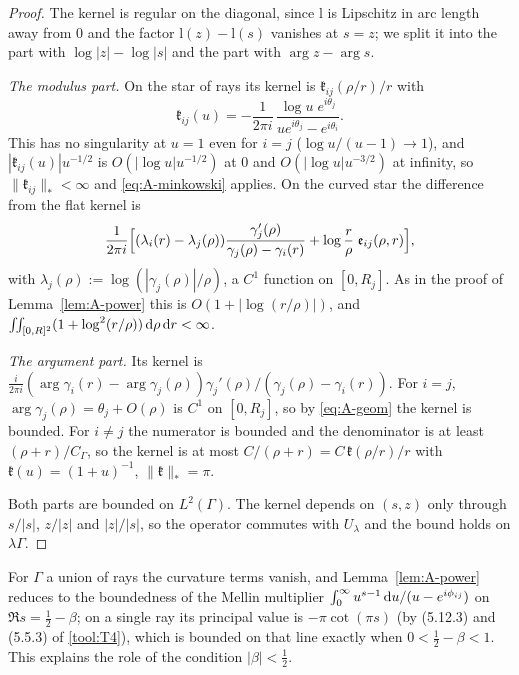 \begin{proof}
The kernel is regular on the diagonal, since $\mathrm l$ is Lipschitz in arc length away from $0$ and the factor
$\mathrm l(z)-\mathrm l(s)$ vanishes at $s=z$; we split it into the part with $\log|z|-\log|s|$ and the part with
$\arg z-\arg s$.

\emph{The modulus part.} On the star of rays its kernel is $\mathfrak k_{ij}(\rho/r)/r$ with
\[
  \mathfrak k_{ij}(u)=-\frac1{2\pi i}\,\frac{\log u\;e^{i\theta_j}}{ue^{i\theta_j}-e^{i\theta_i}} .
\]
This has no singularity at
$u=1$ even for $i=j$ ($\log u/(u-1)\to1$), and $|\mathfrak k_{ij}(u)|u^{-1/2}$ is $O(|\log u|u^{-1/2})$ at $0$ and
$O(|\log u|u^{-3/2})$ at infinity, so $\|\mathfrak k_{ij}\|_*<\infty$ and \eqref{eq:A-minkowski} applies. On the curved star
the difference from the flat kernel is
\[
  \frac1{2\pi i}\Bigl[(\lambda_i(r)-\lambda_j(\rho))\frac{\gamma_j'(\rho)}{\gamma_j(\rho)-\gamma_i(r)}
  +\log\frac r\rho\;\mathfrak e_{ij}(\rho,r)\Bigr],
\]
with $\lambda_j(\rho):=\log(|\gamma_j(\rho)|/\rho)$, a $C^1$ function on
$[0,R_j]$. As in the proof of Lemma~\ref{lem:A-power} this is $O(1+|\log(r/\rho)|)$, and
$\iint_{[0,R]^2}(1+\log^2(r/\rho))\,\mathrm{d}\rho\,\mathrm{d} r<\infty$.

\emph{The argument part.} Its kernel is $\frac{i}{2\pi i}(\arg\gamma_i(r)-\arg\gamma_j(\rho))\gamma_j'(\rho)/(\gamma_j(\rho)-
\gamma_i(r))$. For $i=j$, $\arg\gamma_j(\rho)=\theta_j+O(\rho)$ is $C^1$ on $[0,R_j]$, so by \eqref{eq:A-geom} the kernel is
bounded. For $i\ne j$ the numerator is bounded and the denominator is at least $(\rho+r)/C_\Gamma$, so the kernel is at most
$C/(\rho+r)=C\,\mathfrak k(\rho/r)/r$ with $\mathfrak k(u)=(1+u)^{-1}$, $\|\mathfrak k\|_*=\pi$.

Both parts are bounded on $L^2(\Gamma)$. The kernel depends on $(s,z)$ only through $s/|s|$, $z/|z|$ and $|z|/|s|$,
so the operator commutes with $U_\lambda$ and the bound holds on $\lambda\Gamma$.
\end{proof}

\begin{remark}\label{rem:mellin}
For $\Gamma$ a union of rays the curvature terms vanish, and Lemma~\ref{lem:A-power} reduces to the boundedness of the
Mellin multiplier $\int_0^\infty u^{s-1}\,\mathrm{d} u/(u-e^{i\phi_{ij}})$ on $\Re s=\frac12-\beta$; on a single ray its
principal value is $-\pi\cot(\pi s)$ (by (5.12.3) and (5.5.3) of \ref{tool:T4}), which is bounded on that line exactly
when $0<\frac12-\beta<1$. This explains the role of the condition $|\beta|<\frac12$.
\end{remark}
